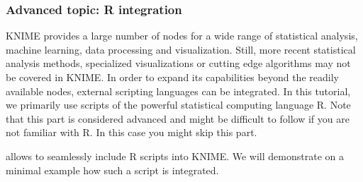 \subsubsection{Advanced topic: R integration}

KNIME provides a large number of nodes for a wide range of statistical analysis, machine learning, data processing and visualization. Still, more recent statistical analysis methods, specialized visualizations or cutting edge algorithms may not be covered in KNIME. In order to expand its capabilities beyond the readily available nodes, external scripting languages can be integrated. In this tutorial, we primarily use scripts of the powerful statistical computing language R. Note that this part is considered advanced and might be difficult to follow if you are not familiar with R. In this case you might skip this part.

 allows to seamlessly include R scripts into KNIME. We will demonstrate on a minimal example how such a script is integrated.

